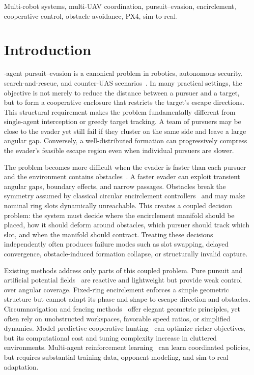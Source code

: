 \documentclass[journal]{IEEEtran}
\begin{document}
\begin{IEEEkeywords}
Multi-robot systems, multi-UAV coordination, pursuit--evasion, encirclement, cooperative control, obstacle avoidance, PX4, sim-to-real.
\end{IEEEkeywords}

\section{Introduction}
\label{sec:intro}

-agent pursuit--evasion is a canonical problem in robotics, autonomous security, search-and-rescue, and counter-UAS scenarios~\cite{pursuit_survey}.
In many practical settings, the objective is not merely to reduce the distance between a pursuer and a target, but to form a cooperative enclosure that restricts the target's escape directions.
This structural requirement makes the problem fundamentally different from single-agent interception or greedy target tracking.
A team of pursuers may be close to the evader yet still fail if they cluster on the same side and leave a large angular gap.
Conversely, a well-distributed formation can progressively compress the evader's feasible escape region even when individual pursuers are slower.

The problem becomes more difficult when the evader is faster than each pursuer and the environment contains obstacles~\cite{isaacs1965,basar1999}.
A faster evader can exploit transient angular gaps, boundary effects, and narrow passages.
Obstacles break the symmetry assumed by classical circular encirclement controllers~\cite{deghat2012,yu2018} and may make nominal ring slots dynamically unreachable.
This creates a coupled decision problem: the system must decide where the encirclement manifold should be placed, how it should deform around obstacles, which pursuer should track which slot, and when the manifold should contract.
Treating these decisions independently often produces failure modes such as slot swapping, delayed convergence, obstacle-induced formation collapse, or structurally invalid capture.

Existing methods address only parts of this coupled problem.
Pure pursuit and artificial potential fields~\cite{apf_classic} are reactive and lightweight but provide weak control over angular coverage.
Fixed-ring encirclement enforces a simple geometric structure but cannot adapt its phase and shape to escape direction and obstacles.
Circumnavigation and fencing methods~\cite{deghat2012,kou2022} offer elegant geometric principles, yet often rely on unobstructed workspaces, favorable speed ratios, or simplified dynamics.
Model-predictive cooperative hunting~\cite{liao2021} can optimize richer objectives, but its computational cost and tuning complexity increase in cluttered environments.
Multi-agent reinforcement learning~\cite{chen2024open} can learn coordinated policies, but requires substantial training data, opponent modeling, and sim-to-real adaptation.
\end{document}
